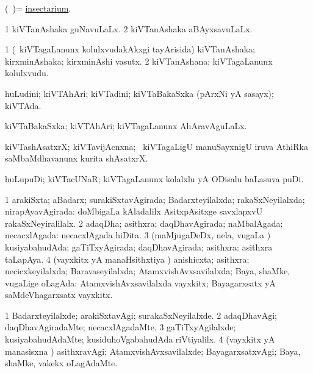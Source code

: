 \bentry
{}
\gl{\nA}
\bmng
(\bava\ )= \hyperlink{insectarium}{insectarium}. 
\emng
\eentry

\bentry
{}
\gl{\gu}
\bmng
\bnum
\num{1} kiVTanAshaka guNavuLaLx. 
\num{2} kiVTanAshaka aBAyxsavuLaLx. 
\enum
\emng
\eentry

\bentry
{}
\gl{\nA}
\bmng
\bnum
\num{1} (\kanmu\ kiVTagaLanunx kolulxvudakAkxgi tayArisida) kiVTanAshaka; kirxminAshaka; kirxminAshi vasutx. 
\num{2} kiVTanAshana; kiVTagaLanunx kolulxvudu. 
\enum
\emng
\eentry

\bentry
{}
\gl{\nA}
\bmng
huLudini; kiVTAhAri; kiVTadini; kiVTaBakaSxka (pArxNi yA sasayx); kiVTAda. 
\emng
\eentry

\bentry
{}
\gl{\gu}
\bmng
kiVTaBakaSxka; kiVTAhAri; kiVTagaLanunx AhAravAguLaLx. 
\emng
\eentry

\bentry
{}
\gl{\nA}
\bmng
kiVTashAsatxrX; kiVTavijAcnxna; \kanmu\ kiVTagaLigU manuSayxnigU iruva AthiRka saMbaMdhavanunx kurita shAsatxrX. 
\emng
\eentry

\bentry
{}
\gl{\nA}
\bmng
huLupuDi; kiVTacUNaR; kiVTagaLanunx kolalxlu yA ODisalu baLasuva puDi. 
\emng
\eentry

\bentry
{}
\gl{\gu}
\bmng
\bnum
\num{1} arakiSxta; aBadarx; surakiSxtavAgirada; Badarxteyilalxda; rakaSxNeyilalxda; nirapAyavAgirada:  doMbigaLa kAladalilx AsitxpAsitxge savxlapxvU rakaSxNeyiralilalx. 
\num{2} adaqDha; asithxra; daqDhavAgirada; naMbalAgada; necacxlAgada:  necacxlAgada hiDita. 
\num{3} (maMjugaDeDx, nela, \mo vugaLa \vi) kusiyabahudAda; gaTiTxyAgirada; daqDhavAgirada; asithxra:  asithxra taLapAya. 
\num{4} (vayxkitx yA manaHsithxtiya \vi) anishicxta; asithxra; necicxkeyilalxda; Baravaseyilalxda; AtamxvishAvxsavilalxda; Baya, shaMke, \mo vugaLige oLagAda:  AtamxvishAvxsavilalxda vayxkitx; Bayagarxsatx yA saMdeVhagarxsatx vayxkitx. 
\enum
\emng
\eentry

\bentry
{}
\gl{\kirxvi}
\bmng
\bnum
\num{1} Badarxteyilalxde; arakiSxtavAgi; surakaSxNeyilalxde. 
\num{2} adaqDhavAgi; daqDhavAgiradaMte; necacxlAgadaMte. 
\num{3} gaTiTxyAgilalxde; kusiyabahudAdaMte; kusiduhoVgabahudAda riVtiyalilx. 
\num{4} (vayxkitx yA manasisxna \vi) asithxravAgi; AtamxvishAvxsavilalxde; BayagarxsatxvAgi; Baya, shaMke, \mo vakekx oLagAdaMte. 
\enum
\emng
\eentry

